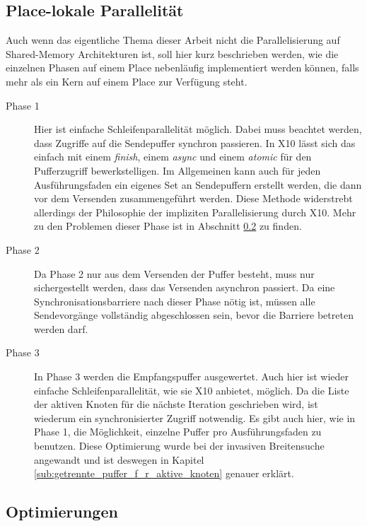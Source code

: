 \subsection{Place-lokale Parallelität} %
\label{sub:place_lokale_parallelit_t}
Auch wenn das eigentliche Thema dieser Arbeit nicht die Parallelisierung auf Shared-Memory Architekturen ist, soll hier kurz beschrieben werden, wie die einzelnen Phasen auf einem Place nebenläufig implementiert werden können, falls mehr als ein Kern auf einem Place zur Verfügung steht.
\begin{description}
	\item[Phase 1] Hier ist einfache Schleifenparallelität möglich. Dabei muss beachtet werden, dass Zugriffe auf die Sendepuffer synchron passieren. In X10 lässt sich das einfach mit einem \textit{finish}, einem \textit{async} und einem \textit{atomic} für den Pufferzugriff bewerkstelligen. Im Allgemeinen kann auch für jeden Ausführungsfaden ein eigenes Set an Sendepuffern erstellt werden, die dann vor dem Versenden zusammengeführt werden. Diese Methode widerstrebt allerdings der Philosophie der impliziten Parallelisierung durch X10. Mehr zu den Problemen dieser Phase ist in Abschnitt \ref{sub:optimierungen} zu finden.	
	\item[Phase 2] Da Phase 2 nur aus dem Versenden der Puffer besteht, muss nur sichergestellt werden, dass das Versenden asynchron passiert. Da eine Synchronisationsbarriere nach dieser Phase nötig ist, müssen alle Sendevorgänge vollständig abgeschlossen sein, bevor die Barriere betreten werden darf.
	\item[Phase 3] In Phase 3 werden die Empfangspuffer ausgewertet. Auch hier ist wieder einfache Schleifenparallelität, wie sie X10 anbietet, möglich. Da die Liste der aktiven Knoten für die nächste Iteration geschrieben wird, ist wiederum ein synchronisierter Zugriff notwendig. Es gibt auch hier, wie in Phase 1, die Möglichkeit, einzelne Puffer pro Ausführungsfaden zu benutzen. Diese Optimierung wurde bei der invasiven Breitensuche angewandt und ist deswegen in Kapitel \ref{sub:getrennte_puffer_f_r_aktive_knoten} genauer erklärt.
\end{description}

\subsection{Optimierungen} %
\label{sub:optimierungen}

